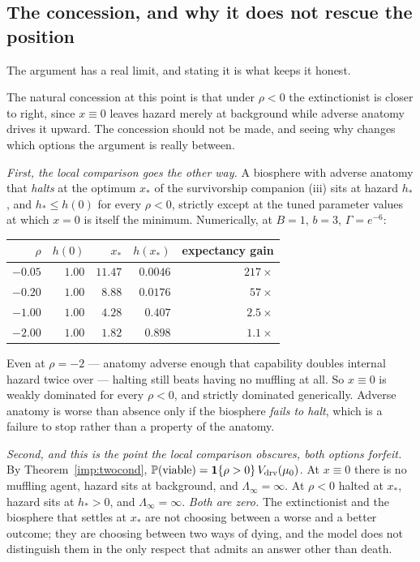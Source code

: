 \subsection{The concession, and why it does not rescue the position}
\label{hr:subsub:concession}

The argument has a real limit, and stating it is what keeps it honest.

\begin{remark}
\label{hr:rem:concession}
The natural concession at this point is that under $\rho<0$ the
extinctionist is closer to right, since $x\equiv0$ leaves hazard merely
at background while adverse anatomy drives it upward. The concession
should not be made, and seeing why changes which options the argument is
really between.

\emph{First, the local comparison goes the other way.} A biosphere with
adverse anatomy that \emph{halts} at the optimum $x_\ast$ of
the survivorship companion \cite{GoldenSurvivorship}(iii) sits at hazard $h_\ast$, and
$h_\ast\le h(0)$ for every $\rho<0$, strictly except at the tuned
parameter values at which $x=0$ is itself the minimum. Numerically, at
$B=1$, $b=3$, $\Gamma=e^{-6}$:
\begin{center}\small
\begin{tabular}{@{}rrrrr@{}}
\toprule
$\rho$ & $h(0)$ & $x_\ast$ & $h(x_\ast)$ & expectancy gain\\
\midrule
$-0.05$ & $1.00$ & $11.47$ & $0.0046$ & $217\times$\\
$-0.20$ & $1.00$ & $8.88$ & $0.0176$ & $57\times$\\
$-1.00$ & $1.00$ & $4.28$ & $0.407$ & $2.5\times$\\
$-2.00$ & $1.00$ & $1.82$ & $0.898$ & $1.1\times$\\
\bottomrule
\end{tabular}
\end{center}
Even at $\rho=-2$ --- anatomy adverse enough that capability doubles
internal hazard twice over --- halting still beats having no muffling at
all. So $x\equiv0$ is weakly dominated for every $\rho<0$, and strictly
dominated generically. Adverse
anatomy is worse than absence only if the biosphere \emph{fails to
halt}, which is a failure to stop rather than a property of the anatomy.

\emph{Second, and this is the point the local comparison obscures, both
options forfeit.} By Theorem~\ref{imp:twocond},
$\mathbb{P}(\text{viable})=\mathbf{1}\{\rho>0\}\,V_{\mathrm{drv}}(\mu_0)$. At
$x\equiv0$ there is no muffling agent, hazard sits at background, and
$\Lambda_\infty=\infty$. At $\rho<0$ halted at $x_\ast$, hazard sits at
$h_\ast>0$, and $\Lambda_\infty=\infty$. \emph{Both are zero.} The
extinctionist and the biosphere that settles at $x_\ast$ are not
choosing between a worse and a better outcome; they are choosing between
two ways of dying, and the model does not distinguish them in the only
respect that admits an answer other than death.


\end{remark}
